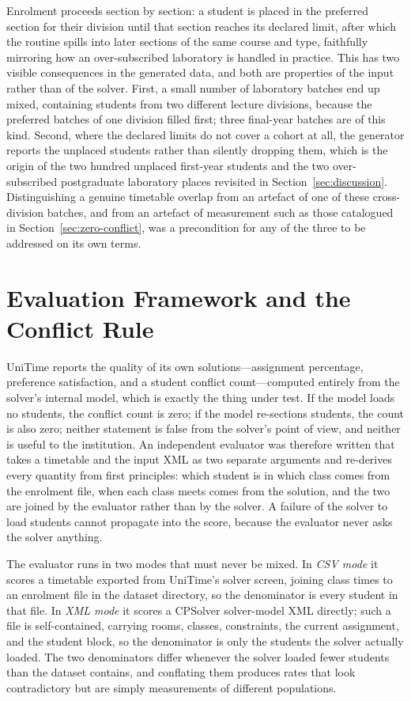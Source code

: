 \documentclass[journal]{IEEEtran}
\begin{document}
Enrolment proceeds section by section: a student is placed in the preferred section for their division until that section reaches its declared limit, after which the routine spills into later sections of the same course and type, faithfully mirroring how an over-subscribed laboratory is handled in practice. This has two visible consequences in the generated data, and both are properties of the input rather than of the solver. First, a small number of laboratory batches end up mixed, containing students from two different lecture divisions, because the preferred batches of one division filled first; three final-year batches are of this kind. Second, where the declared limits do not cover a cohort at all, the generator reports the unplaced students rather than silently dropping them, which is the origin of the two hundred unplaced first-year students and the two over-subscribed postgraduate laboratory places revisited in Section~\ref{sec:discussion}. Distinguishing a genuine timetable overlap from an artefact of one of these cross-division batches, and from an artefact of measurement such as those catalogued in Section~\ref{sec:zero-conflict}, was a precondition for any of the three to be addressed on its own terms.

\section{Evaluation Framework and the Conflict Rule}
\label{sec:evaluator}

UniTime reports the quality of its own solutions---assignment percentage, preference satisfaction, and a student conflict count---computed entirely from the solver's internal model, which is exactly the thing under test. If the model loads no students, the conflict count is zero; if the model re-sections students, the count is also zero; neither statement is false from the solver's point of view, and neither is useful to the institution. An independent evaluator was therefore written that takes a timetable and the input XML as two separate arguments and re-derives every quantity from first principles: which student is in which class comes from the enrolment file, when each class meets comes from the solution, and the two are joined by the evaluator rather than by the solver. A failure of the solver to load students cannot propagate into the score, because the evaluator never asks the solver anything.

The evaluator runs in two modes that must never be mixed. In \emph{CSV mode} it scores a timetable exported from UniTime's solver screen, joining class times to an enrolment file in the dataset directory, so the denominator is every student in that file. In \emph{XML mode} it scores a CPSolver solver-model XML directly; such a file is self-contained, carrying rooms, classes, constraints, the current assignment, and the student block, so the denominator is only the students the solver actually loaded. The two denominators differ whenever the solver loaded fewer students than the dataset contains, and conflating them produces rates that look contradictory but are simply measurements of different populations.
\end{document}
